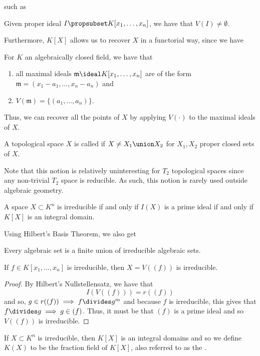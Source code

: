 \documentclass[11pt,leqno,oneside]{amsbook}
\newcommand{\m}{\mathfrak{m}}
\numberwithin{thm}{section}
\begin{document}
such as 
\begin{prop}
 Given proper ideal \(I \propsubset K[x_1, \ldots, x_n]\), we have
 that \(V(I) \neq 
 \emptyset\). 
\end{prop}
Furthermore, \(K[X]\) allows us to recover \(X\) in a functorial way,
since we have
\begin{cor}
  For \(K\) an algebraically closed field, we have that
  \begin{enumerate}
  \item all maximal ideals \(\m \ideal K[x_1, \ldots, x_n]\) are of
    the form \(\m = (x_1-a_1, \ldots, x_n - a_n)\) and
  \item \(V(\m) = \{(a_1, \ldots, a_n)\}\).
  \end{enumerate}
\end{cor}
Thus, we can recover all the points of \(X\) by applying \(V(\cdot)\)
to the maximal ideals of \(X\).
\begin{defn}
  A topological space \(X\) is called  if \(X \neq X_1
  \union X_2\) for \(X_1,X_2\) proper closed sets of \(X\).
\end{defn}
\begin{rmk}
  Note that this notion is relatively uninteresting for \(T_2\)
  topological spaces since any non-trivial \(T_2\) space is
  reducible. As such, this notion is rarely used outside algebraic
  geometry. 
\end{rmk}
\begin{prop}
  A space \(X \subset K^n\) is irreducible if and only if \(I(X)\) is
  a prime 
  ideal if and only if \(K[X]\) is an integral domain.
\end{prop}
Using Hilbert's Basis Theorem, we also get 
\begin{prop}
  Every algebraic set is a finite union of irreducible algebraic sets.
\end{prop}
\begin{prop}
  If \(f \in K[x_1, \ldots, x_n]\) is irreducible, then \(X = V((f))\)
  is irreducible.
\end{prop}
\begin{proof}
  By Hilbert's Nullstellensatz, we have that \[
    I(V((f))) = r((f))
  \]
  and so, \(g \in r((f)) \implies f \divides g^m\) and because \(f\)
  is irreducible, this gives that \(f \divides g \implies g \in
  (f)\). Thus, it must be that \((f)\) is a prime ideal and so
  \(V((f))\) is irreducible.
\end{proof}
\begin{defn}
  If \(X \subset K^n\) is irreducible, then \(K[X]\) is an integral
  domains and so we define \(K(X)\) to be the fraction field of
  \(K[X]\), also referred to as the .
\end{defn}
\end{document}
